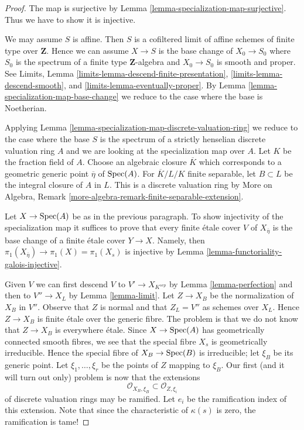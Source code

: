 \begin{proof}
The map is surjective by
Lemma \ref{lemma-specialization-map-surjective}.
Thus we have to show it is injective.

\medskip\noindent
We may assume $S$ is affine. Then $S$ is a cofiltered limit of affine
schemes of finite type over $\mathbf{Z}$.
Hence we can assume $X \to S$ is the
base change of $X_0 \to S_0$ where $S_0$ is the spectrum of a finite
type $\mathbf{Z}$-algebra and $X_0 \to S_0$ is smooth and proper.
See Limits, Lemma \ref{limits-lemma-descend-finite-presentation},
\ref{limits-lemma-descend-smooth}, and
\ref{limits-lemma-eventually-proper}. By
Lemma \ref{lemma-specialization-map-base-change}
we reduce to the case where the base is Noetherian.

\medskip\noindent
Applying Lemma \ref{lemma-specialization-map-discrete-valuation-ring}
we reduce to the case where the base $S$ is the spectrum of a
strictly henselian discrete valuation ring $A$ and we are
looking at the specialization map over $A$.
Let $K$ be the fraction field of $A$.
Choose an algebraic closure $\overline{K}$ which
corresponds to a geometric generic point $\overline{\eta}$ of $\mathop{\mathrm{Spec}}(A)$.
For $\overline{K}/L/K$ finite separable, let $B \subset L$ be the
integral closure of $A$ in $L$. This is a discrete
valuation ring by
More on Algebra, Remark \ref{more-algebra-remark-finite-separable-extension}.

\medskip\noindent
Let $X \to \mathop{\mathrm{Spec}}(A)$ be as in the previous paragraph.
To show injectivity of the specialization map
it suffices to prove that every finite
\'etale cover $V$ of $X_{\overline{\eta}}$ is the base
change of a finite \'etale cover $Y \to X$.
Namely, then $\pi_1(X_{\overline{\eta}}) \to \pi_1(X) = \pi_1(X_s)$
is injective by Lemma \ref{lemma-functoriality-galois-injective}.

\medskip\noindent
Given $V$ we can first descend $V$ to $V' \to X_{K^{sep}}$ by
Lemma \ref{lemma-perfection} and then to
$V'' \to X_L$ by Lemma \ref{lemma-limit}.
Let $Z \to X_B$ be the normalization of $X_B$ in $V''$.
Observe that $Z$ is normal and that $Z_L = V''$ as schemes
over $X_L$. Hence $Z \to X_B$ is finite \'etale over
the generic fibre. The problem is that we do not know that
$Z \to X_B$ is everywhere \'etale. Since $X \to \mathop{\mathrm{Spec}}(A)$
has geometrically connected smooth fibres, we see that
the special fibre $X_s$ is geometrically irreducible.
Hence the special fibre of $X_B \to \mathop{\mathrm{Spec}}(B)$ is irreducible;
let $\xi_B$ be its generic point. Let
$\xi_1, \ldots, \xi_r$ be the points of $Z$ mapping to
$\xi_B$. Our first (and it will turn out only) problem
is now that the extensions
$$
\mathcal{O}_{X_B, \xi_B} \subset \mathcal{O}_{Z, \xi_i}
$$
of discrete valuation rings may be ramified. Let $e_i$ be
the ramification index of this extension. Note that since the
characteristic of $\kappa(s)$ is zero, the ramification is tame!


\end{proof}

